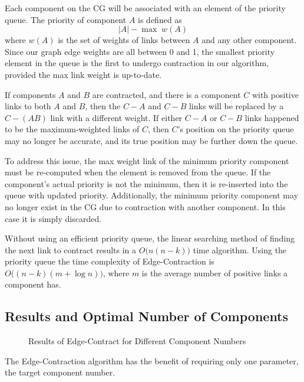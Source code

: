 Each component on the CG will be associated with an element of the
priority queue. The priority of component $A$ is defined as
\[ |A| - \max\;w(A) \]
where $w(A)$ is the set of weights of links between $A$ and any other
component. Since our graph edge weights are all between 0 and 1,
the smallest priority element in the queue is the first to undergo
contraction in our algorithm, provided the max link weight is up-to-date.

If components $A$ and $B$ are contracted, and there is a component $C$
with positive links to both $A$ and $B$, then the $C-A$ and $C-B$ links
will be replaced by a $C-(AB)$ link with a different weight. If either
$C-A$ or $C-B$ links happened to be the maximum-weighted links of $C$,
then $C$'s position on the priority queue may no longer be accurate, and
its true position may be further down the queue.

To address this issue, the max weight link of the minimum priority
component must be re-computed when the element is removed from the queue.
If the component's actual priority is not the minimum, then it is
re-inserted into the queue with updated priority.
Additionally, the minimum priority component may no longer exist in the
CG due to contraction with another component. In this case it is simply
discarded.

Without using an efficient priority queue, the linear searching method
of finding the next link to contract results in a $O\big(n (n-k)\big)$
time algorithm. Using the priority queue the time complexity of
Edge-Contraction is $O \big((n - k) (m + \log n)\big)$, where $m$ is
the average number of positive links a component has.

\subsection{Results and Optimal Number of Components}

\begin{figure}
\caption{Results of Edge-Contract for Different Component Numbers}
\end{figure}

The Edge-Contraction algorithm has the benefit of requiring only one
parameter, the target component number. 